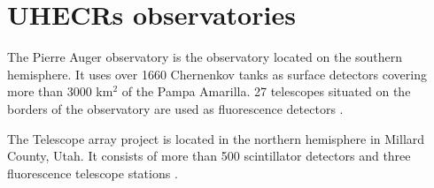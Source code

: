 \section{UHECRs observatories}
The Pierre Auger observatory is the observatory located on the southern hemisphere. It uses over 1660 Chernenkov tanks as surface detectors covering more than 3000 k$\textrm{m}^2$ of the Pampa Amarilla. 27 telescopes situated on the borders of the observatory are used as fluorescence detectors \cite{Tomankova2016_1000061954}.
\par
The Telescope array project is located in the northern hemisphere in Millard County, Utah. It consists of more than 500 scintillator detectors and  three fluorescence telescope stations \cite{Array}.


